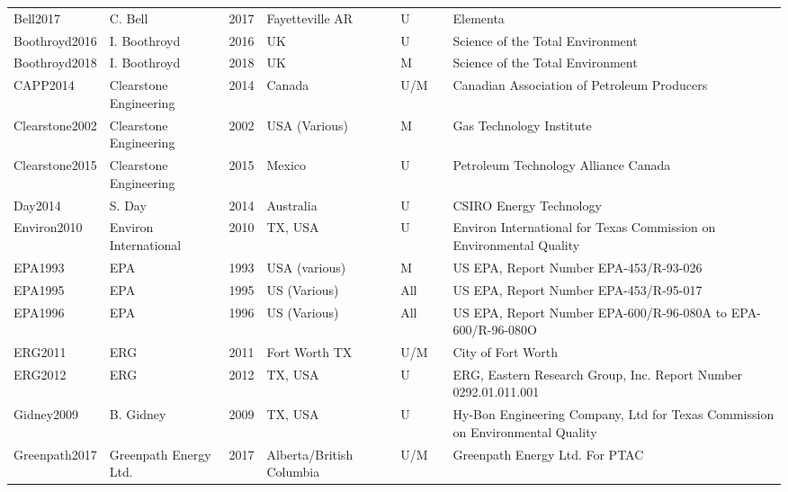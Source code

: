 \documentclass[11pt]{report}
\begin{document}
\begin{landscape}
\begin{table}[]
\begin{scriptsize}
\begin{tabular*}{1\columnwidth}{lllllll}
Bell2017         		& C. Bell      		& 2017 	& Fayetteville AR	& U     	&\cite{Bell2017}     & Elementa\\
Boothroyd2016     	& I. Boothroyd 	& 2016 	& UK   		& U     	& \cite{Boothroyd2016}& Science of the Total Environment      \\
Boothroyd2018     	& I. Boothroyd 	& 2018 	& UK   		& M     	& \cite{Boothroyd2018}        & Science of the Total Environment      \\
CAPP2014	& Clearstone Engineering & 2014 	& Canada         	& U/M   	& \cite{CAPP2014} & Canadian Association of Petroleum Producers     \\
Clearstone2002   	& Clearstone Engineering & 2002 	& USA (Various)  	& M     	& \cite{Clearstone2002}  & Gas Technology Institute    \\
Clearstone2015    	& Clearstone Engineering & 2015 	& Mexico         	& U     	& \cite{Clearstone2015}     & Petroleum Technology Alliance Canada  \\
Day2014 	& S. Day       		& 2014 	& Australia      		& U     	& \cite{Day2014}    & CSIRO Energy Technology     \\
Environ2010       	& Environ International  	& 2010 	& TX, USA        	& U     	& \cite{Environ2010}    & Environ International for Texas Commission on Environmental Quality \\
EPA1993 	& EPA		& 1993 	& USA (various)  	& M     	& \cite{EPA1993}       & US EPA, Report Number EPA-453/R-93-026\\
EPA1995 	& EPA		& 1995 	& US (Various)   	& All   	& \cite{EPA1995b} & US EPA, Report Number EPA-453/R-95-017\\
EPA1996 	& EPA		& 1996 	& US (Various)   	& All   	& \cite{EPA1996}     & US EPA, Report Number EPA-600/R-96-080A to EPA-600/R-96-080O        \\
ERG2011 	& ERG		& 2011 	& Fort Worth TX  	& U/M   	& \cite{ERG2011}     & City of Fort Worth\\
ERG2012 	& ERG		& 2012 	& TX, USA        	& U     	& \cite{ERG2012}         & ERG, Eastern Research Group, Inc. Report Number 0292.01.011.001     \\
Gidney2009        	& B. Gidney    		& 2009 	& TX, USA        	& U     	& \cite{Gidney2009}     & Hy-Bon Engineering Company, Ltd for Texas Commission on Environmental Quality \\
Greenpath2017     	& Greenpath Energy Ltd.  & 2017 	& Alberta/British Columbia & U/M   	& \cite{Greenpath2017}   & Greenpath Energy Ltd. For PTAC        \\

\end{tabular*}
\end{scriptsize}
\end{table}
\end{landscape}
\end{document}
